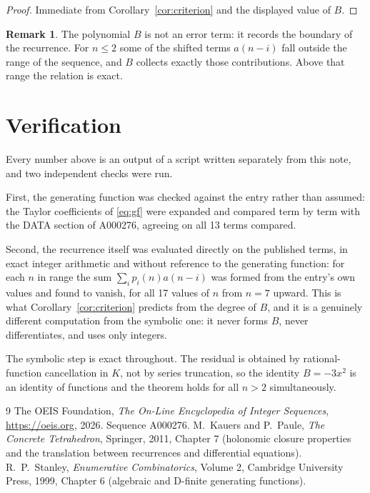 \documentclass[11pt,a4paper]{article}
\theoremstyle{plain}
\theoremstyle{definition}
\newtheorem{remark}[theorem]{Remark}
\begin{document}
\begin{proof}
Immediate from Corollary~\ref{cor:criterion} and the displayed value of $B$.
\end{proof}

\begin{remark}
The polynomial $B$ is not an error term: it records the boundary of the recurrence. For
$n\le2$ some of the shifted terms $a(n-i)$ fall outside the range of the sequence,
and $B$ collects exactly those contributions. Above that range the relation is exact.
\end{remark}

\section{Verification}

Every number above is an output of a script written separately from this note, and two
independent checks were run.

First, the generating function was checked against the entry rather than assumed: the
Taylor coefficients of \eqref{eq:gf} were expanded and compared term by term with the DATA
section of A000276, agreeing on all 13 terms compared.

Second, the recurrence itself was evaluated directly on the published terms, in exact
integer arithmetic and without reference to the generating function: for each $n$ in range
the sum $\sum_{i}p_{i}(n)a(n-i)$ was formed from the entry's own values and found to
vanish, for all 17 values of $n$ from $n=7$ upward. This is what
Corollary~\ref{cor:criterion} predicts from the degree of $B$, and it is a genuinely
different computation from the symbolic one: it never forms $B$, never differentiates, and
uses only integers.

The symbolic step is exact throughout. The residual is obtained by rational-function
cancellation in $K$, not by series truncation, so the identity $B=- 3 x^{2}$ is an
identity of functions and the theorem holds for all $n>2$ simultaneously.

\begin{thebibliography}{9}
 The OEIS Foundation, \emph{The On-Line Encyclopedia of Integer Sequences},
\url{https://oeis.org}, 2026. Sequence A000276.
 M.~Kauers and P.~Paule, \emph{The Concrete Tetrahedron}, Springer, 2011,
Chapter 7 (holonomic closure properties and the translation between recurrences and
differential equations).
 R.~P.~Stanley, \emph{Enumerative Combinatorics}, Volume 2, Cambridge
University Press, 1999, Chapter 6 (algebraic and D-finite generating functions).
\end{thebibliography}
\end{document}
